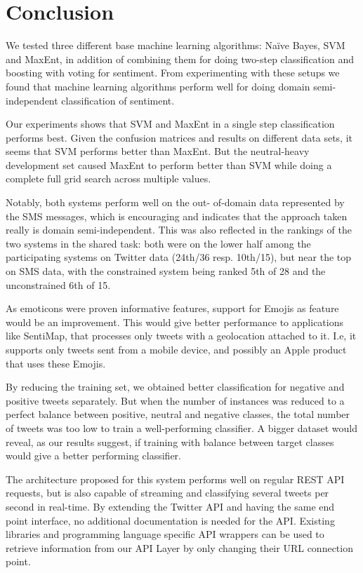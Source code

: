 \chapter{Conclusion}
We tested three different base machine learning algorithms: Na\"{i}ve Bayes, SVM and MaxEnt, in addition of combining them for doing two-step classification and boosting with voting for sentiment. From experimenting with these setups we found that machine learning algorithms perform well for doing domain semi-independent classification of sentiment.

Our experiments shows that SVM and MaxEnt in a single step classification performs best. Given the confusion matrices and results on different data sets, it seems that SVM performs better than MaxEnt. But the neutral-heavy development set caused MaxEnt to perform better than SVM while doing a complete full grid search across multiple values.

Notably, both systems perform well on the out- of-domain data represented by the SMS messages, which is encouraging and indicates that the approach taken really is domain semi-independent. This was also reflected in the rankings of the two systems in the shared task: both were on the lower half among the participating systems on Twitter data (24th/36 resp. 10th/15), but near the top on SMS data, with the constrained system being ranked 5th of 28  and the unconstrained 6th of 15.

As emoticons were proven informative features, support for Emojis as feature would be an improvement. This would give better performance to applications like SentiMap, that processes only tweets with a geolocation attached to it. I.e, it supports only tweets sent from a mobile device, and possibly an Apple product that uses these Emojis.

By reducing the training set, we obtained better classification for negative and positive tweets separately. But when the number of instances was reduced to a perfect balance between positive, neutral and negative classes, the total number of tweets was too low to train a well-performing classifier. A bigger dataset would reveal, as our results suggest, if training with balance between target classes would give a better performing classifier.

The architecture proposed for this system performs well on regular REST API requests, but is also capable of streaming and classifying several tweets per second in real-time. By extending the Twitter API and having the same end point interface, no additional documentation is needed for the API. Existing libraries and programming language specific API wrappers can be used to retrieve information from our API Layer by only changing their URL connection point. 

